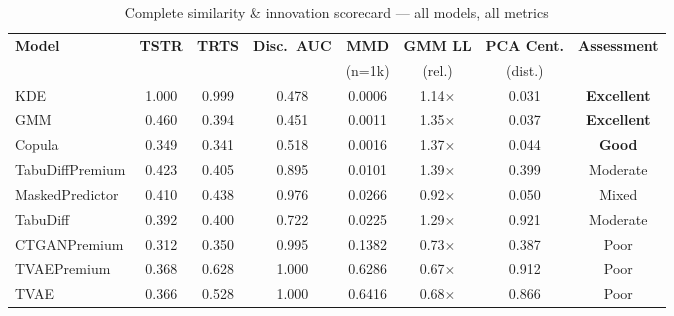 \documentclass[12pt,a4paper]{article}
\begin{document}
\begin{table}[H]
\centering
\caption{Complete similarity \& innovation scorecard --- all models, all metrics}
\label{tab:scorecard}
\renewcommand{\arraystretch}{1.35}
\begin{tabular}{lccccccc}
\toprule
\textbf{Model} & \textbf{TSTR} & \textbf{TRTS} & \textbf{Disc.\ AUC} & \textbf{MMD} & \textbf{GMM LL} & \textbf{PCA Cent.} & \textbf{Assessment} \\
& & & & \footnotesize(n=1k) & \footnotesize(rel.) & \footnotesize(dist.) & \\
\midrule
KDE             & \cellcolor{success!20}1.000 & 0.999 & \cellcolor{success!20}0.478 & \cellcolor{success!20}0.0006 & 1.14$\times$ & \cellcolor{success!20}0.031 & \textbf{Excellent} \\
GMM             & \cellcolor{success!10}0.460 & 0.394 & \cellcolor{success!20}0.451 & \cellcolor{success!15}0.0011 & 1.35$\times$ & \cellcolor{success!20}0.037 & \textbf{Excellent} \\
Copula          & 0.349 & 0.341 & \cellcolor{success!15}0.518 & \cellcolor{success!15}0.0016 & 1.37$\times$ & \cellcolor{success!20}0.044 & \textbf{Good} \\
TabuDiffPremium & 0.423 & 0.405 & 0.895 & 0.0101 & 1.39$\times$ & 0.399 & Moderate \\
MaskedPredictor & 0.410 & 0.438 & 0.976 & 0.0266 & 0.92$\times$ & 0.050 & Mixed \\
TabuDiff        & 0.392 & 0.400 & 0.722 & 0.0225 & 1.29$\times$ & 0.921 & Moderate \\
CTGANPremium    & 0.312 & 0.350 & 0.995 & 0.1382 & 0.73$\times$ & 0.387 & Poor \\
TVAEPremium     & 0.368 & 0.628 & \cellcolor{danger!15}1.000 & \cellcolor{danger!15}0.6286 & 0.67$\times$ & 0.912 & Poor \\
TVAE            & 0.366 & 0.528 & \cellcolor{danger!15}1.000 & \cellcolor{danger!15}0.6416 & 0.68$\times$ & 0.866 & Poor \\
\bottomrule
\end{tabular}
\end{table}
\end{document}
